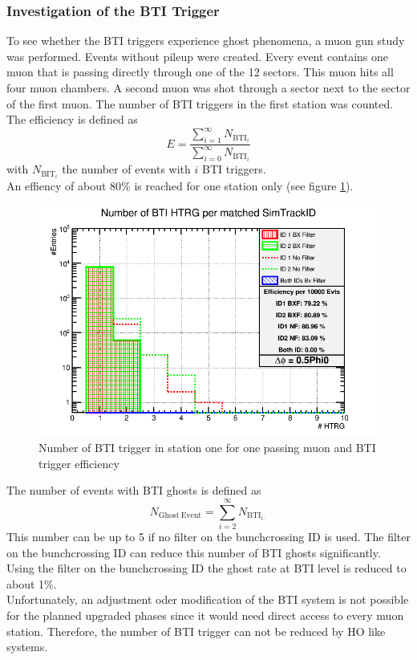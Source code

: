 \subsubsection{Investigation of the BTI Trigger}
To see whether the BTI triggers experience ghost phenomena, a muon gun study was performed. Events without pileup were created. Every event contains one muon that is passing directly through one of the 12 sectors. This muon hits all four muon chambers. A second muon was shot through a sector next to the sector of the first muon. The number of BTI triggers in the first station was counted.\\
The efficiency is defined as
\begin{equation}
E=\frac{\sum_{i = 1}^\infty N_{\mathrm{BTI}_i}}{\sum_{i = 0}^\infty N_{\mathrm{BTI}_i}}
\end{equation}
with $N_{\mathrm{BIT}_i}$ the number of events with $i$ BTI triggers.\\
An effiency of about 80\% is reached for one station only (see figure \ref{BTIEfficiency}).
\begin{figure}
\begin{minipage}[t]{0.95\textwidth}
\includegraphics[width=\textwidth]{Figures/scheuch/SectorGunPt100dPhi0_5Phi0_h1dFilteredBtiHitsPerEvtSL1.png}
\caption{Number of BTI trigger in station one for one passing muon and BTI trigger efficiency}
\label{BTIEfficiency}
\end{minipage}
\end{figure}
The number of events with BTI ghosts is defined as
\begin{equation}
N_{\mathrm{Ghost\ Event}} = \sum_{i = 2}^\infty N_{\mathrm{BTI}_{i\cdot}}
\end{equation}
This number can be up to 5 if no filter on the bunchcrossing ID is used. The filter on the bunchcrossing ID can reduce this number of BTI ghosts significantly. Using the filter on the bunchcrossing ID the ghost rate at BTI level is reduced to about 1\%.\\
Unfortunately, an adjustment oder modification of the BTI system is not possible for the planned upgraded phases since it would need direct access to every muon station. Therefore, the number of BTI trigger can not be reduced by HO like systems.